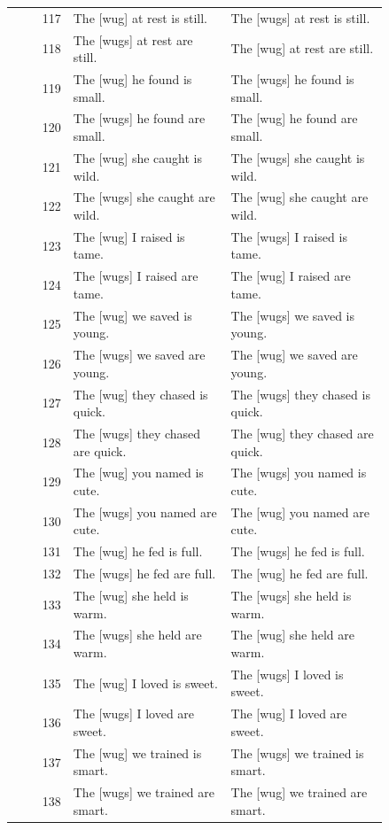 \begin{table}[p]
\begin{tabular}{@{}rp{0.42\linewidth}p{0.42\linewidth}@{}}
117 & The {[}wug{]} at rest is still. & The {[}wugs{]} at rest is still. \\
118 & The {[}wugs{]} at rest are still. & The {[}wug{]} at rest are still. \\
119 & The {[}wug{]} he found is small. & The {[}wugs{]} he found is small. \\
120 & The {[}wugs{]} he found are small. & The {[}wug{]} he found are small. \\
121 & The {[}wug{]} she caught is wild. & The {[}wugs{]} she caught is wild. \\
122 & The {[}wugs{]} she caught are wild. & The {[}wug{]} she caught are wild. \\
123 & The {[}wug{]} I raised is tame. & The {[}wugs{]} I raised is tame. \\
124 & The {[}wugs{]} I raised are tame. & The {[}wug{]} I raised are tame. \\
125 & The {[}wug{]} we saved is young. & The {[}wugs{]} we saved is young. \\
126 & The {[}wugs{]} we saved are young. & The {[}wug{]} we saved are young. \\
127 & The {[}wug{]} they chased is quick. & The {[}wugs{]} they chased is quick. \\
128 & The {[}wugs{]} they chased are quick. & The {[}wug{]} they chased are quick. \\
129 & The {[}wug{]} you named is cute. & The {[}wugs{]} you named is cute. \\
130 & The {[}wugs{]} you named are cute. & The {[}wug{]} you named are cute. \\
131 & The {[}wug{]} he fed is full. & The {[}wugs{]} he fed is full. \\
132 & The {[}wugs{]} he fed are full. & The {[}wug{]} he fed are full. \\
133 & The {[}wug{]} she held is warm. & The {[}wugs{]} she held is warm. \\
134 & The {[}wugs{]} she held are warm. & The {[}wug{]} she held are warm. \\
135 & The {[}wug{]} I loved is sweet. & The {[}wugs{]} I loved is sweet. \\
136 & The {[}wugs{]} I loved are sweet. & The {[}wug{]} I loved are sweet. \\
137 & The {[}wug{]} we trained is smart. & The {[}wugs{]} we trained is smart. \\
138 & The {[}wugs{]} we trained are smart. & The {[}wug{]} we trained are smart. \\

\end{tabular}
\end{table}
